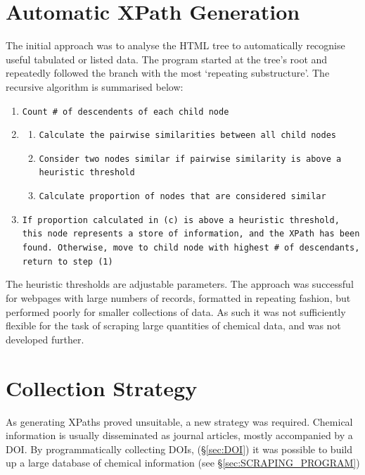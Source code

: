 \section{Automatic XPath Generation}
The initial approach was to analyse the HTML tree to automatically recognise useful tabulated or listed data. The program started at the tree's root and repeatedly followed the branch with the most `repeating substructure'. The recursive algorithm is summarised below:
\begin{sloppypar}
\begin{enumerate}
\item \texttt{Count \# of descendents of each child node}
\item \begin{enumerate}
\item \texttt{Calculate the pairwise similarities between all child nodes}
\item \texttt{Consider  two nodes similar if pairwise similarity is above a heuristic threshold}
\item \texttt{Calculate proportion of nodes that are considered similar}
\end{enumerate}
\item \texttt{If proportion calculated in (c) is above a heuristic threshold, this node represents a store of information, and the XPath has been found. Otherwise, move to child node with highest \# of descendants, return to step (1)}
\end{enumerate}
\end{sloppypar}
The heuristic thresholds are adjustable parameters. The approach was successful for webpages with large numbers of records, formatted in repeating fashion, but performed poorly for smaller collections of data. As such it was not sufficiently flexible for the task of scraping large quantities of chemical data, and was not developed further.
\section{Collection Strategy}
As generating XPaths proved unsuitable, a new strategy was required. Chemical information is usually disseminated as journal articles, mostly accompanied by a DOI. By programmatically collecting DOIs, (\S\ref{sec:DOI}) it was possible to build up a large database of chemical information (see  \S\ref{sec:SCRAPING_PROGRAM})
